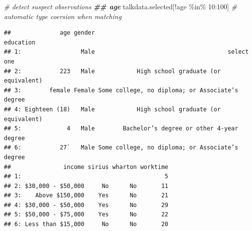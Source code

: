 \documentclass[
  12pt,
]{article}
\newenvironment{Shaded}{\begin{snugshade}}{\end{snugshade}}
\newcommand{\CommentTok}[1]{\textcolor[rgb]{0.56,0.35,0.01}{\textit{#1}}}
\newcommand{\DecValTok}[1]{\textcolor[rgb]{0.00,0.00,0.81}{#1}}
\newcommand{\DocumentationTok}[1]{\textcolor[rgb]{0.56,0.35,0.01}{\textbf{\textit{#1}}}}
\newcommand{\ErrorTok}[1]{\textcolor[rgb]{0.64,0.00,0.00}{\textbf{#1}}}
\newcommand{\FunctionTok}[1]{\textcolor[rgb]{0.00,0.00,0.00}{#1}}
\newcommand{\NormalTok}[1]{#1}
\newcommand{\OtherTok}[1]{\textcolor[rgb]{0.56,0.35,0.01}{#1}}
\newcommand{\SpecialCharTok}[1]{\textcolor[rgb]{0.00,0.00,0.00}{#1}}
\newcommand{\StringTok}[1]{\textcolor[rgb]{0.31,0.60,0.02}{#1}}
\begin{document}
\begin{Shaded}
\begin{Highlighting}[]
\CommentTok{\# detect suspect observations}
\DocumentationTok{\#\# age}
\NormalTok{talkdata.selected[}\SpecialCharTok{!}\NormalTok{age }\SpecialCharTok{\%in\%} \DecValTok{10}\SpecialCharTok{:}\DecValTok{100}\NormalTok{] }\CommentTok{\# automatic type coersion when matching}
\end{Highlighting}
\end{Shaded}

\begin{verbatim}
##              age gender                                       education
## 1:                 Male                                      select one
## 2:           223   Male            High school graduate (or equivalent)
## 3:        female Female Some college, no diploma; or Associate’s degree
## 4: Eighteen (18)   Male            High school graduate (or equivalent)
## 5:             4   Male        Bachelor’s degree or other 4-year degree
## 6:           27`   Male Some college, no diploma; or Associate’s degree
##               income sirius wharton worktime
## 1:                                         5
## 2: $30,000 - $50,000     No      No       11
## 3:    Above $150,000    Yes      No       21
## 4: $30,000 - $50,000    Yes      No       29
## 5: $50,000 - $75,000    Yes      No       22
## 6: Less than $15,000     No      No       20
\end{verbatim}

\begin{Shaded}
\end{Shaded}
\end{document}
